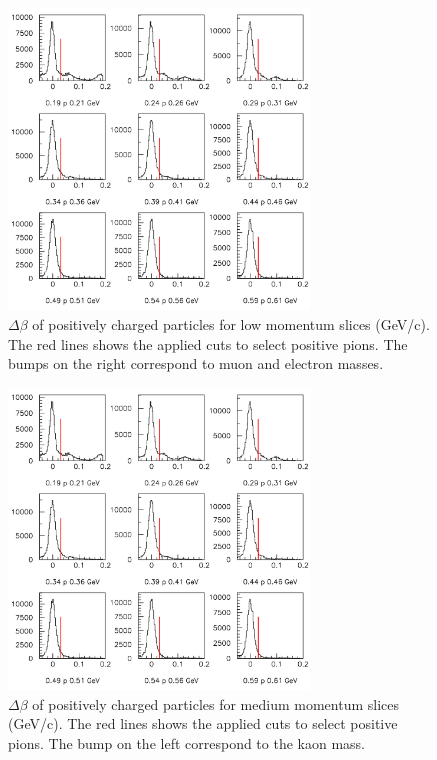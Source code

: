 \begin{figure}[tbp]
\centering
\includegraphics[width=8cm] {answer-fig/TofProfile1.png} 
\caption {$\Delta \beta$ of positively charged particles for low momentum slices 
(GeV/c). The red lines shows the applied cuts to select positive pions. The bumps on the right
correspond to muon and electron masses.}
\label{TOF-1}
\end{figure}

\begin{figure}[tbp]
\centering
\includegraphics[width=8cm] {answer-fig/TofProfile1.png} 
\caption {$\Delta \beta$ of positively charged particles for medium momentum slices 
(GeV/c). The red lines shows the applied cuts to select positive pions. The bump on the left
correspond to the kaon mass.}
\label{TOF-2}
\end{figure}

